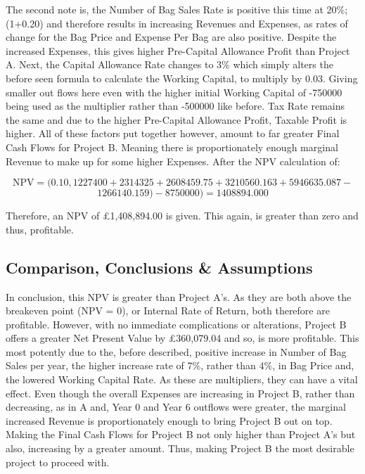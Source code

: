 \documentclass[11pt, english]{article}
\begin{document}
	The second note is, the Number of Bag Sales Rate is positive this time at 20\%; (1+0.20) and therefore results in increasing Revenues and Expenses, as rates of change for the Bag Price and Expense Per Bag are also positive. Despite the increased Expenses, this gives higher Pre-Capital Allowance Profit than Project A. Next, the Capital Allowance Rate changes to 3\% which simply alters the before seen formula to calculate the Working Capital, to multiply by 0.03. Giving smaller out flows here even with the higher initial Working Capital of -750000 being used as the multiplier rather than -500000 like before. Tax Rate remains the same and due to the higher Pre-Capital Allowance Profit, Taxable Profit is higher. All of these factors put together however, amount to far greater Final Cash Flows for Project B. Meaning there is proportionately enough marginal Revenue to make up for some higher Expenses. After the NPV calculation of: 

	$$\mathrm{NPV=(0.10,1227400+2314325+2608459.75+3210560.163+5946635.087-}$$ $$\mathrm{1266140.159)-8750000)=1408894.000}$$

	Therefore, an NPV of \pounds1,408,894.00 is given. This again, is greater than zero and thus, profitable.

	\subsection{Comparison, Conclusions \& Assumptions}

	In conclusion, this NPV is greater than Project A’s. As they are both above the breakeven point (NPV = 0), or Internal Rate of Return, both therefore are profitable. However, with no immediate complications or alterations, Project B offers a greater Net Present Value by \pounds360,079.04 and so, is more profitable. This most potently due to the, before described, positive increase in Number of Bag Sales per year, the higher increase rate of 7\%, rather than 4\%, in Bag Price and, the lowered Working Capital Rate. As these are multipliers, they can have a vital effect. Even though the overall Expenses are increasing in Project B, rather than decreasing, as in A and, Year 0 and Year 6 outflows were greater, the marginal increased Revenue is proportionately enough to bring Project B out on top. Making the Final Cash Flows for Project B not only higher than Project A’s but also, increasing by a greater amount. Thus, making Project B the most desirable project to proceed with.\\
\end{document}

